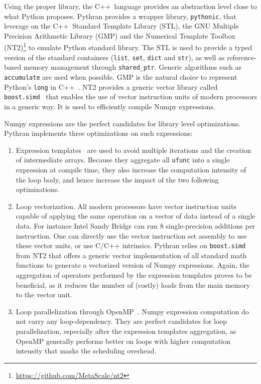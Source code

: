 \documentclass[10pt, onecolumn, preprint]{sigplanconf}
\providecommand{\cpp}[1][~]{\textsc{C++}#1}
\begin{document}
Using the proper library, the \cpp language provides an abstraction level close
to what Python proposes. Pythran provides a wrapper library, \texttt{pythonic},
that leverage on the \cpp Standard Template Library (STL), the GNU Multiple
Precision Arithmetic Library (GMP) and the Numerical Template Toolbox
(NT2)\footnote{\url{https://github.com/MetaScale/nt2}} to emulate Python
standard library. The STL is used to provide a typed version of the standard
containers (\texttt{list}, \texttt{set}, \texttt{dict} and \texttt{str}), as
well as reference-based memory management through \texttt{shared\_ptr}. Generic
algorithms such as \texttt{accumulate} are used when possible. GMP is the
natural choice to represent Python's \texttt{long} in \cpp. NT2 provides a generic
vector library called \texttt{boost.simd}~\cite{esterie2012boost} that enables
the use of vector instruction units of modern processors in a generic way. It is used
to efficiently compile Numpy expressions.

Numpy expressions are the perfect candidates for library level optimizations.
Pythran implements three optimizations on such expressions:

\begin{enumerate}

    \item Expression templates~\cite{expression_templates} are used to avoid
        multiple iterations and the creation of intermediate arrays. Because
        they aggregate all \texttt{ufunc} into a single expression at compile
        time, they also increase the computation intensity of the loop body,
        and hence increase the impact of the two following optimizations.

    \item Loop vectorization. All modern processors have vector instruction
        units capable of applying the same operation on a vector of data
        instead of a single data. For instance Intel Sandy Bridge can run 8
        single-precision additions per instruction. One can directly use the
        vector instruction set assembly to use these vector units, or use C/C++
        intrinsics. Pythran relies on \texttt{boost.simd} from NT2 that offers
        a generic vector implementation of all standard math functions to
        generate a vectorized version of Numpy expressions. Again, the
        aggregation of operators performed by the expression templates proves
        to be beneficial, as it reduces the number of (costly) loads from the
        main memory to the vector unit.

    \item Loop parallelization through OpenMP~\cite{openmp3.1}. Numpy expression
        computation do not carry any loop-dependency. They are perfect
        candidates for loop parallelization, especially after the expression
        templates aggregation, as OpenMP generally performs better on loops
        with higher computation intensity that masks the scheduling overhead.

\end{enumerate}
\end{document}

